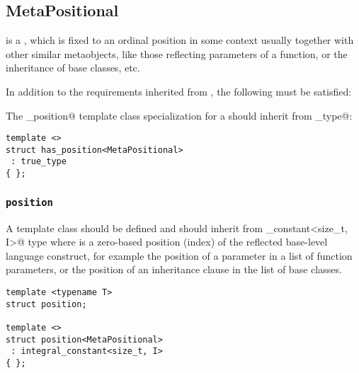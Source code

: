 \subsection{MetaPositional}
\label{concept-MetaPositional}


 is a , which is fixed to an ordinal position in some context
usually together with other similar metaobjects, like those reflecting parameters of a function,
or the inheritance of base classes, etc.

In addition to the requirements inherited from ,
the following must be satisfied:

The \verb@has_position@ template class specialization for a  should
inherit from \verb@true_type@:

\begin{verbatim}
template <>
struct has_position<MetaPositional>
 : true_type
{ };
\end{verbatim}

\subsubsection{\texttt{position}}

A template class \verb@position@ should be defined and should
inherit from \verb@integral_constant<size_t, I>@ type where \verb@I@ is
a zero-based position (index) of the reflected base-level language construct,
for example the position of a parameter in a list of function parameters,
or the position of an inheritance clause in the list of base classes.

\begin{verbatim}
template <typename T>
struct position;

template <>
struct position<MetaPositional>
 : integral_constant<size_t, I>
{ };
\end{verbatim}


